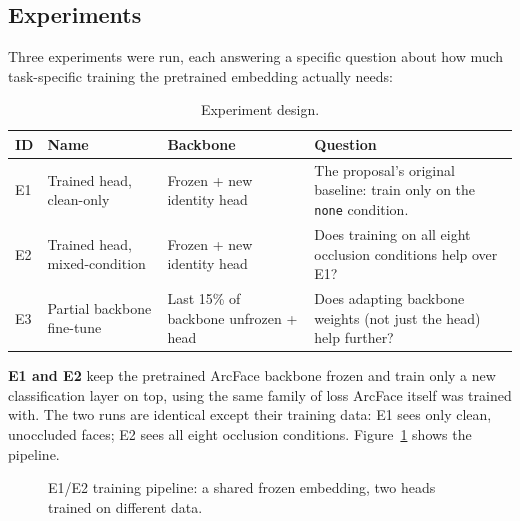 \documentclass[11pt]{article}
\begin{document}
\subsection{Experiments}

Three experiments were run, each answering a specific question about how much task-specific training the pretrained embedding actually needs:

\begin{table}[h]
\centering
\caption{Experiment design.}
\begin{tabular}{L{1cm}L{3cm}L{3.6cm}L{6cm}}
\toprule
\textbf{ID} & \textbf{Name} & \textbf{Backbone} & \textbf{Question} \\
\midrule
E1 & Trained head, clean-only & Frozen + new identity head & The proposal's original baseline: train only on the \texttt{none} condition. \\
E2 & Trained head, mixed-condition & Frozen + new identity head & Does training on all eight occlusion conditions help over E1? \\
E3 & Partial backbone fine-tune & Last 15\% of backbone unfrozen + head & Does adapting backbone weights (not just the head) help further? \\
\bottomrule
\end{tabular}
\end{table}

\textbf{E1 and E2} keep the pretrained ArcFace backbone frozen and train only a new classification layer on top, using the same family of loss ArcFace itself was trained with. The two runs are identical except their training data: E1 sees only clean, unoccluded faces; E2 sees all eight occlusion conditions. Figure~\ref{fig:pipeline-e1e2} shows the pipeline.

\begin{figure}[htbp]
\centering
{}
\caption{E1/E2 training pipeline: a shared frozen embedding, two heads trained on different data.}
\label{fig:pipeline-e1e2}
\end{figure}
\end{document}
